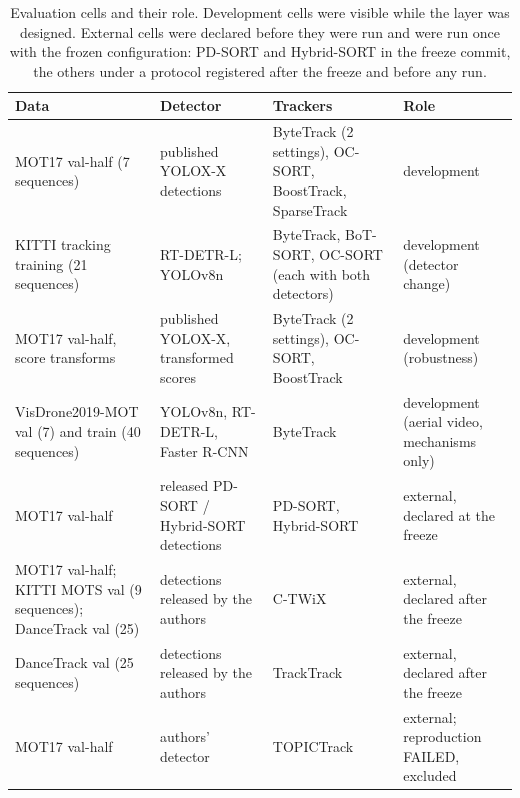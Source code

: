 \documentclass[pdflatex,sn-mathphys-num]{sn-jnl}
\begin{document}
\begin{table}[t]
\caption{Evaluation cells and their role. Development cells were visible while
the layer was designed. External cells were declared before they were run and
were run once with the frozen configuration: PD-SORT and Hybrid-SORT in the
freeze commit, the others under a protocol registered after the freeze and
before any run.}
\label{tab:data}
\centering\footnotesize
\setlength{\tabcolsep}{3pt}
\begin{tabular}{@{}>{\raggedright\arraybackslash}p{31mm}>{\raggedright\arraybackslash}p{28mm}>{\raggedright\arraybackslash}p{35mm}>{\raggedright\arraybackslash}p{26mm}@{}}
\toprule
Data & Detector & Trackers & Role\\
\midrule
MOT17 val-half (7 sequences) & published YOLOX-X detections & ByteTrack (2 settings), OC-SORT, BoostTrack, SparseTrack & development\\
KITTI tracking training (21 sequences) & RT-DETR-L; YOLOv8n & ByteTrack, BoT-SORT, OC-SORT (each with both detectors) & development (detector change)\\
MOT17 val-half, score transforms & published YOLOX-X, transformed scores & ByteTrack (2 settings), OC-SORT, BoostTrack & development (robustness)\\
VisDrone2019-MOT val (7) and train (40 sequences) & YOLOv8n, RT-DETR-L, Faster R-CNN & ByteTrack & development (aerial video, mechanisms only)\\
MOT17 val-half & released PD-SORT / Hybrid-SORT detections & PD-SORT, Hybrid-SORT & external, declared at the freeze\\
MOT17 val-half; KITTI MOTS val (9 sequences); DanceTrack val (25) & detections released by the authors & C-TWiX & external, declared after the freeze\\
DanceTrack val (25 sequences) & detections released by the authors & TrackTrack & external, declared after the freeze\\
MOT17 val-half & authors' detector & TOPICTrack & external; reproduction FAILED, excluded\\
\bottomrule
\end{tabular}
\end{table}
\end{document}
